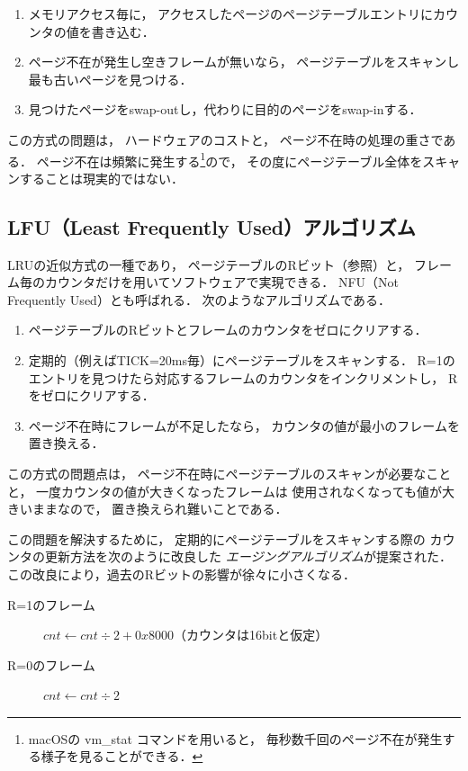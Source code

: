 \begin{enumerate}
\item メモリアクセス毎に，
  アクセスしたページのページテーブルエントリにカウンタの値を書き込む．
\item ページ不在が発生し空きフレームが無いなら，
  ページテーブルをスキャンし最も古いページを見つける．
\item 見つけたページをswap-outし，代わりに目的のページをswap-inする．
\end{enumerate}

この方式の問題は，
ハードウェアのコストと，
ページ不在時の処理の重さである．
ページ不在は頻繁に発生する\footnote{
macOSの vm\_stat コマンドを用いると，
毎秒数千回のページ不在が発生する様子を見ることができる．}ので，
その度にページテーブル全体をスキャンすることは現実的ではない．

\subsection{LFU（Least Frequently Used）アルゴリズム}
LRUの近似方式の一種であり，
ページテーブルのRビット（参照）と，
フレーム毎のカウンタだけを用いてソフトウェアで実現できる．
NFU（Not Frequently Used）とも呼ばれる．
次のようなアルゴリズムである．

\begin{enumerate}
\item ページテーブルのRビットとフレームのカウンタをゼロにクリアする．
\item 定期的（例えばTICK=20ms毎）にページテーブルをスキャンする．
  R=1のエントリを見つけたら対応するフレームのカウンタをインクリメントし，
  Rをゼロにクリアする．
\item ページ不在時にフレームが不足したなら，
  カウンタの値が最小のフレームを置き換える．
\end{enumerate}

この方式の問題点は，
ページ不在時にページテーブルのスキャンが必要なことと，
一度カウンタの値が大きくなったフレームは
使用されなくなっても値が大きいままなので，
置き換えられ難いことである．

この問題を解決するために，
定期的にページテーブルをスキャンする際の
カウンタの更新方法を次のように改良した
\emph{エージングアルゴリズム}が提案された．
この改良により，過去のRビットの影響が徐々に小さくなる．

\begin{description}
\item[R=1のフレーム]
  $cnt \leftarrow cnt \div 2 + 0x8000$（カウンタは16bitと仮定）
\item[R=0のフレーム]
$cnt \leftarrow cnt \div 2$
\end{description}

